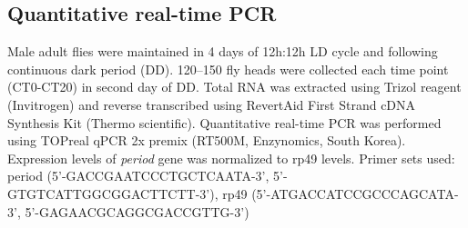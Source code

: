 \subsection*{Quantitative real-time PCR}

Male adult flies were maintained in 4 days of 12h:12h LD cycle and following continuous dark period (DD). 120--150 fly heads were collected each time point (CT0-CT20) in second day of DD.
Total RNA was extracted using Trizol reagent (Invitrogen) and reverse transcribed using RevertAid First Strand cDNA Synthesis Kit (Thermo scientific).
Quantitative real-time PCR was performed using TOPreal qPCR 2x premix (RT500M, Enzynomics, South Korea). Expression levels of \emph{period} gene was normalized to rp49 levels.
Primer sets used: period (5'-GACCGAATCCCTGCTCAATA-3', 5'-GTGTCATTGGCGGACTTCTT-3'), rp49 (5'-ATGACCATCCGCCCAGCATA-3', 5'-GAGAACGCAGGCGACCGTTG-3')
    
  
  
  
  
  
  
  